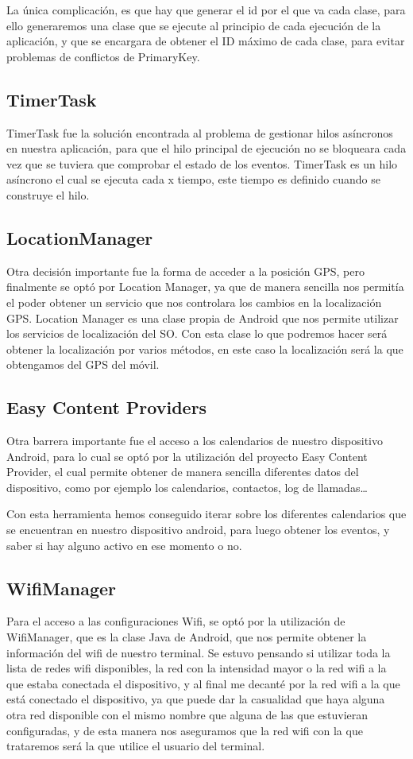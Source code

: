 La única complicación, es que hay que generar el id por el que va cada clase, para ello generaremos una clase que se ejecute al principio de cada ejecución de la aplicación, y que se encargara de obtener el ID máximo de cada clase, para evitar problemas de conflictos de PrimaryKey.

\subsection{TimerTask}
TimerTask fue la solución encontrada al problema de gestionar hilos asíncronos en nuestra aplicación, para que el hilo principal de ejecución no se bloqueara cada vez que se tuviera que comprobar el estado de los eventos.
TimerTask es un hilo asíncrono el cual se ejecuta cada x tiempo, este tiempo es definido cuando se construye el hilo.

\subsection{LocationManager}
Otra decisión importante fue la forma de acceder a la posición GPS, pero finalmente se optó por Location Manager, ya que de manera sencilla nos permitía el poder obtener un servicio que nos controlara los cambios en la localización GPS.
Location Manager es una clase propia de Android que nos permite utilizar los servicios de localización del SO. Con esta clase lo que podremos hacer será obtener la localización por varios métodos, en este caso la localización será la que obtengamos del GPS del móvil. 

\subsection{Easy Content Providers}
Otra barrera importante fue el acceso a los calendarios de nuestro dispositivo Android, para lo cual se optó por la utilización del proyecto Easy Content Provider, el cual permite obtener de manera sencilla diferentes datos del dispositivo, como por ejemplo los calendarios, contactos, log de llamadas\ldots

Con esta herramienta hemos conseguido iterar sobre los diferentes calendarios que se encuentran en nuestro dispositivo android, para luego obtener los eventos, y saber si hay alguno activo en ese momento o no.\cite{easycontent}

\subsection{WifiManager}
Para el acceso a las configuraciones Wifi, se optó por la utilización de WifiManager, que es la clase Java de Android, que nos permite obtener la información del wifi de nuestro terminal. Se estuvo pensando si utilizar toda la lista de redes wifi disponibles, la red con la intensidad mayor o la red wifi a la que estaba conectada el dispositivo, y al final me decanté por la red wifi a la que está conectado el dispositivo, ya que puede dar la casualidad que haya alguna otra red disponible con el mismo nombre que alguna de las que estuvieran configuradas, y de esta manera nos aseguramos que la red wifi con la que trataremos será la que utilice el usuario del terminal.\cite{wifimanager}

